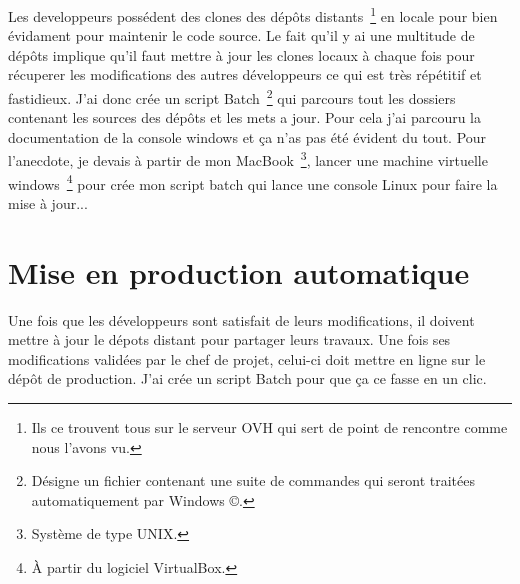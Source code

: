 Les developpeurs possédent des clones des dépôts distants\, \footnote{Ils ce
trouvent tous sur le serveur OVH qui sert de point de rencontre comme nous
l'avons vu.} en locale pour bien évidament pour maintenir le code source. Le
fait qu'il y ai une multitude de dépôts implique qu'il faut mettre à jour les
clones locaux à chaque fois pour récuperer les modifications des autres
développeurs ce qui est très répétitif et fastidieux. J'ai donc crée un script
Batch\, \footnote{Désigne un fichier contenant une suite de commandes qui
seront traitées automatiquement par Windows \copyright.} qui parcours tout les
dossiers contenant les sources des dépôts et les mets a jour. Pour cela j'ai
parcouru la documentation de la console windows et ça n'as pas été évident du
tout. Pour l'anecdote, je devais à partir de mon MacBook\, \footnote{Système de
type UNIX.}, lancer une machine virtuelle windows\, \footnote{À partir du
logiciel VirtualBox.} pour crée mon script batch qui lance une console Linux
pour faire la mise à jour...


\section{Mise en production automatique} %

Une fois que les développeurs sont satisfait de leurs modifications, il doivent
mettre à jour le dépots distant pour partager leurs travaux. Une fois ses
modifications validées par le chef de projet, celui-ci doit mettre en ligne sur
le dépôt de production. J'ai crée un script Batch pour que ça ce fasse en un
clic.

\clearpage
